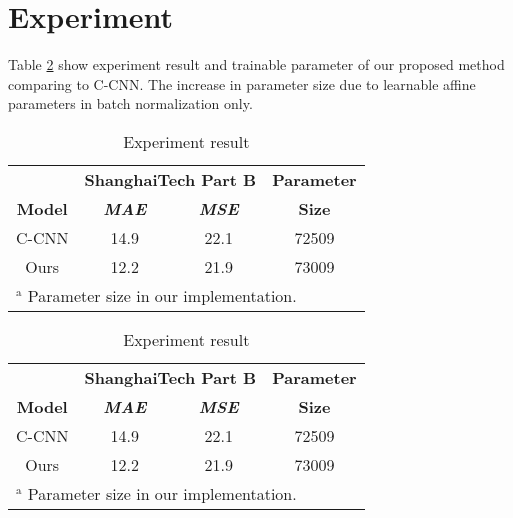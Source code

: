 \section{Experiment}

Table \ref{tab:experiment-result} show experiment result and trainable parameter of our proposed method comparing to C-CNN. The increase in parameter size due to learnable affine parameters in batch normalization only. 

\begin{table}[htbp]
\caption{\label{tab:experiment-result}  Experiment result}
\begin{center}
\begin{tabular}{|c|c|c|c|}
\hline
\textbf{}&\multicolumn{2}{|c|}{\textbf{ShanghaiTech Part B}}&\textbf{Parameter} \\
\cline{1-3}
\textbf{Model} & \textbf{\textit{MAE}}& \textbf{\textit{MSE}}&\textbf{Size} \\
\hline
C-CNN & 14.9 & 22.1 & 72509   \\
\hline
Ours & 12.2 & 21.9 & 73009 \\
\hline
\multicolumn{4}{l}{$^{\mathrm{a}}$ Parameter size in our implementation.}
\end{tabular}

\end{center}
\end{table}


\begin{table}[htbp]
\caption{\label{tab:experiment-result}  Experiment result}
\begin{center}
\begin{tabular}{|c|c|c|c|}
\hline
\textbf{}&\multicolumn{2}{|c|}{\textbf{ShanghaiTech Part B}}&\textbf{Parameter} \\
\cline{1-3}
\textbf{Model} & \textbf{\textit{MAE}}& \textbf{\textit{MSE}}&\textbf{Size} \\
\hline
C-CNN & 14.9 & 22.1 & 72509   \\
\hline
Ours & 12.2 & 21.9 & 73009 \\
\hline
\multicolumn{4}{l}{$^{\mathrm{a}}$ Parameter size in our implementation.}
\end{tabular}

\end{center}
\end{table}
